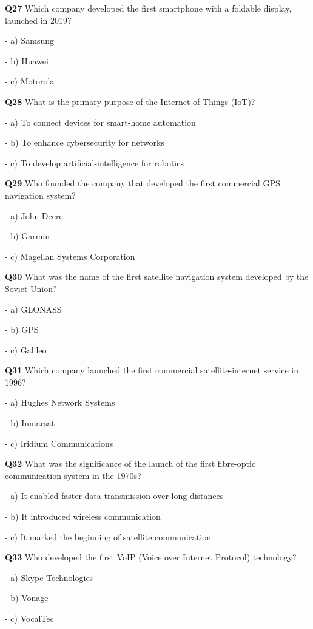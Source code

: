 \textbf{Q27} Which company developed the first smartphone with a foldable display, launched in 2019?\par
\quad - a) Samsung\par
\quad - b) Huawei\par
\quad - c) Motorola\par

\textbf{Q28} What is the primary purpose of the Internet of Things (IoT)?\par
\quad - a) To connect devices for smart-home automation\par
\quad - b) To enhance cybersecurity for networks\par
\quad - c) To develop artificial-intelligence for robotics\par

\textbf{Q29} Who founded the company that developed the first commercial GPS navigation system?\par
\quad - a) John Deere\par
\quad - b) Garmin\par
\quad - c) Magellan Systems Corporation\par

\textbf{Q30} What was the name of the first satellite navigation system developed by the Soviet Union?\par
\quad - a) GLONASS\par
\quad - b) GPS\par
\quad - c) Galileo\par

\textbf{Q31} Which company launched the first commercial satellite-internet service in 1996?\par
\quad - a) Hughes Network Systems\par
\quad - b) Inmarsat\par
\quad - c) Iridium Communications\par

\textbf{Q32} What was the significance of the launch of the first fibre-optic communication system in the 1970s?\par
\quad - a) It enabled faster data transmission over long distances\par
\quad - b) It introduced wireless communication\par
\quad - c) It marked the beginning of satellite communication\par

\textbf{Q33} Who developed the first VoIP (Voice over Internet Protocol) technology?\par
\quad - a) Skype Technologies\par
\quad - b) Vonage\par
\quad - c) VocalTec\par

